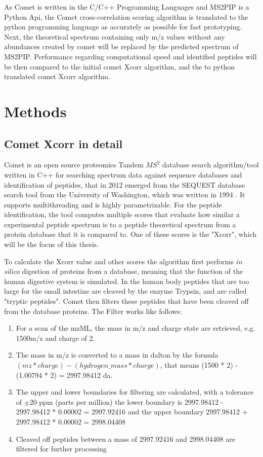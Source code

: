 \documentclass[11pt]{article}
\begin{document}
As Comet is written in the C/C++ Programming Languages and MS2PIP is a Python Api, the Comet cross-correlation scoring algorithm is translated to the python programming language as accurately as possible for fast prototyping. Next, the theoretical spectrum containing only m/z values without any abundances created by comet will be replaced by the predicted spectrum of MS2PIP. Performance regarding computational speed and identified peptides will be then compared to the initial comet Xcorr algorithm, and the to python translated comet Xcorr algorithm. 

\newpage

\section{Methods}
\subsection{Comet Xcorr in detail}
Comet is an open source proteomics Tandem \(MS^2\) database search algorithm/tool written in C++ for searching spectrum data against sequence databases and identification of peptides, that in 2012 emerged from the SEQUEST database search tool from the University of Washington, which was written in 1994 \cite{comet-search-tool}. It supports multithreading and is highly parametrizable. For the peptide identification, the tool computes multiple scores that evaluate how similar a experimental peptide spectrum is to a peptide theoretical spectrum from a protein database that it is compared to. One of these scores is the "Xcorr", which will be the focus of this thesis. 


To calculate the Xcorr value and other scores the algorithm first performs \textit{in silico} digestion of proteins from a database, meaning that the function of the human digestive system is simulated. In the human body peptides that are too large for the small intestine are cleaved by the enzyme Trypsin, and are called "tryptic peptides". Comet then filters these peptides that have been cleaved off from the database proteins. The Filter works like follows:
\begin{enumerate}
    \item For a scan of the mzML, the mass in m/z and charge state are retrieved, e.g. 1500m/z and charge of 2.
    \item The mass in m/z is converted to a mass in dalton by the formula \begin{math}(mz * charge) - (hydrogen\_mass * charge)\end{math}, that means (1500 * 2) - (1.00794 * 2) = 2997.98412 da.
    \item The upper and lower boundaries for filtering are calculated, with a tolerance of $\pm$20 ppm (parts per million) the lower boundary is 2997.98412 - 2997.98412 * 0.00002 = 2997.92416 and the upper boundary 2997.98412 + 2997.98412 * 0.00002 = 2998.04408
    \item Cleaved off peptides between a mass of 2997.92416 and 2998.04408 are filtered for further processing
\end{enumerate}
\end{document}
